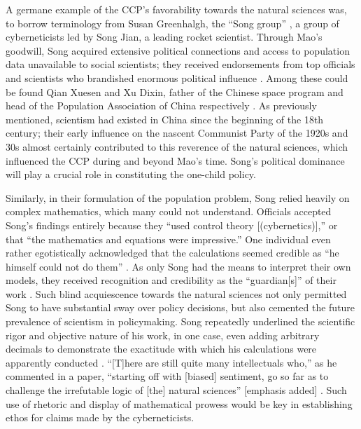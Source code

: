 A germane example of the CCP’s favorability towards the natural sciences was, to borrow terminology from Susan Greenhalgh, the “Song group” \autocite{Greenhalgh2008JustOneChild}, a group of cyberneticists led by Song Jian, a leading rocket scientist. Through Mao’s goodwill, Song acquired extensive political connections and access to population data unavailable to social scientists; they received endorsements from top officials and scientists who brandished enormous political influence \autocite[p.\ 140]{Greenhalgh2008JustOneChild}. Among these could be found Qian Xuesen and Xu Dixin, father of the Chinese space program and head of the Population Association of China respectively \autocite[p.\ 243]{Greenhalgh2008JustOneChild}. As previously mentioned, scientism had existed in China since the beginning of the 18th century; their early influence on the nascent Communist Party of the 1920s and 30s almost certainly contributed to this reverence of the natural sciences, which influenced the CCP during and beyond Mao’s time. Song’s political dominance will play a crucial role in constituting the one-child policy.

Similarly, in their formulation of the population problem, Song relied heavily on complex mathematics, which many could not understand. Officials accepted Song’s findings entirely because they “used control theory [(cybernetics)],” or that “the mathematics and equations were impressive.” One individual even rather egotistically acknowledged that the calculations seemed credible as “he himself could not do them” \autocite[p.\ 246]{Greenhalgh2008JustOneChild}. As only Song had the means to interpret their own models, they received recognition and credibility as the “guardian[s]” of their work \autocite[p.\ 294]{CaidenWildavsky1980}. Such blind acquiescence towards the natural sciences not only permitted Song to have substantial sway over policy decisions, but also cemented the future prevalence of scientism in policymaking. Song repeatedly underlined the scientific rigor and objective nature of his work, in one case, even adding arbitrary decimals to demonstrate the exactitude with which his calculations were apparently conducted \autocite[p.\ 218]{Greenhalgh2008JustOneChild}. “[T]here are still quite many intellectuals who,” as he commented in a paper, “starting off with [biased] sentiment, go so far as to challenge the irrefutable logic of [the] natural sciences” [emphasis added] \autocite{Song1985SystemsScienceReforms}. Such use of rhetoric and display of mathematical prowess would be key in establishing ethos for claims made by the cyberneticists.

